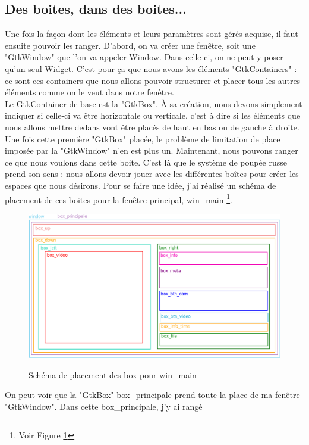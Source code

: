 \documentclass[11pt,french,a4paper]{report}
\begin{document}
        \subsection{Des boites, dans des boites...}
Une fois la façon dont les éléments et leurs paramètres sont gérés acquise, il faut ensuite pouvoir les ranger. 
D'abord, on va créer une fenêtre, soit une "GtkWindow" que l'on va appeler Window. Dans celle-ci, on ne peut y poser qu'un seul Widget. 
C'est pour ça que nous avons les éléments "GtkContainers" : ce sont ces containers que nous allons pouvoir structurer et placer tous 
les autres éléments comme on le veut dans notre fenêtre. \\
Le GtkContainer de base est la "GtkBox". À sa création, nous devons simplement indiquer si celle-ci va être horizontale ou verticale, 
c'est à dire si les éléments que nous allons mettre dedans vont être placés de haut en bas ou de gauche à droite. 
Une fois cette première "GtkBox" placée, le problème de limitation de place imposée par la "GtkWindow" n'en est plus un. 
Maintenant, nous pouvons ranger ce que nous voulons dans cette boite. C'est là que le système de poupée russe prend son sens : 
nous allons devoir jouer avec les différentes boîtes pour créer les espaces que nous désirons. 
Pour se faire une idée, j'ai réalisé un schéma de placement de ces boites pour la fenêtre principal, win\_main 
\footnote{Voir Figure \ref{sch_box_win_main}}.
\begin{figure}[!h]
    \centering
        \includegraphics[scale=0.5]{../images/dia/schema_bloc_mainwin.png} \\
        \caption{Schéma de placement des box pour win\_main}
        \label{sch_box_win_main}
\end{figure}
On peut voir que la "GtkBox" box\_principale prend toute la place de ma fenêtre "GtkWindow". Dans cette box\_principale, j'y ai rangé 
\end{document}
